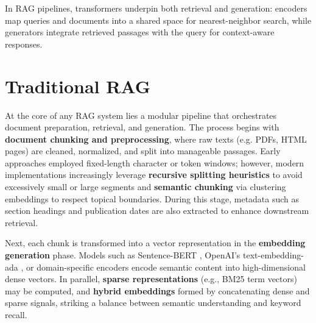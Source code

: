 \documentclass[12pt,twoside]{report}
\begin{document}
In RAG pipelines, transformers underpin both retrieval and generation: encoders map queries and documents into a shared space for nearest-neighbor search, while generators integrate retrieved passages with the query for context-aware responses.

\section{Traditional RAG}

At the core of any RAG system lies a modular pipeline that orchestrates document preparation, retrieval, and generation. The process begins with \textbf{document chunking and preprocessing}, where raw texts (e.g. PDFs, HTML pages) are cleaned, normalized, and split into manageable passages. Early approaches employed fixed-length character or token windows; however, modern implementations increasingly leverage \textbf{recursive splitting heuristics}\cite{RecurrentChunking}\cite{SplittingHeuristics} to avoid excessively small or large segments and \textbf{semantic chunking} via clustering embeddings to respect topical boundaries. During this stage, metadata such as section headings and publication dates are also extracted to enhance downstream retrieval.

Next, each chunk is transformed into a vector representation in the \textbf{embedding generation} phase. Models such as Sentence-BERT \cite{SentenceBERT}, OpenAI's text-embedding-ada \cite{OpenAITextEmbedding}, or domain-specific encoders encode semantic content into high-dimensional dense vectors. In parallel, \textbf{sparse representations} (e.g., BM25\cite{BM25} term vectors) may be computed, and \textbf{hybrid embeddings} formed by concatenating dense and sparse signals, striking a balance between semantic understanding and keyword recall.
\end{document}

